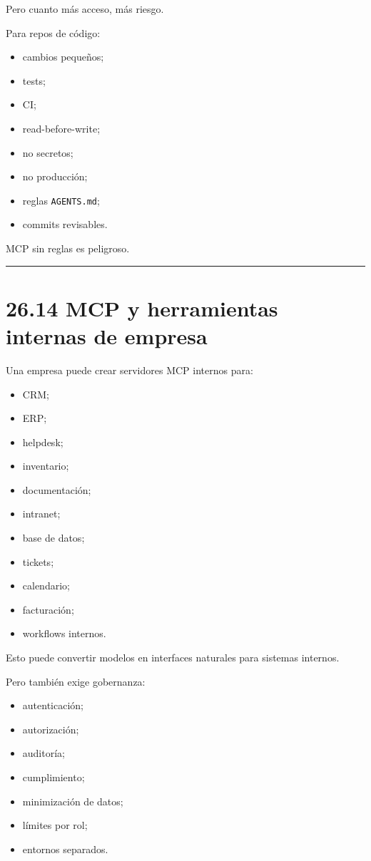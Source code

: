 Pero cuanto más acceso, más riesgo.

Para repos de código:

\begin{itemize}
\tightlist
\item
  cambios pequeños;
\item
  tests;
\item
  CI;
\item
  read-before-write;
\item
  no secretos;
\item
  no producción;
\item
  reglas \passthrough{\lstinline!AGENTS.md!};
\item
  commits revisables.
\end{itemize}

MCP sin reglas es peligroso.

\begin{center}\rule{0.5\linewidth}{0.5pt}\end{center}

\section{26.14 MCP y herramientas internas de
empresa}\label{mcp-y-herramientas-internas-de-empresa}

Una empresa puede crear servidores MCP internos para:

\begin{itemize}
\tightlist
\item
  CRM;
\item
  ERP;
\item
  helpdesk;
\item
  inventario;
\item
  documentación;
\item
  intranet;
\item
  base de datos;
\item
  tickets;
\item
  calendario;
\item
  facturación;
\item
  workflows internos.
\end{itemize}

Esto puede convertir modelos en interfaces naturales para sistemas
internos.

Pero también exige gobernanza:

\begin{itemize}
\tightlist
\item
  autenticación;
\item
  autorización;
\item
  auditoría;
\item
  cumplimiento;
\item
  minimización de datos;
\item
  límites por rol;
\item
  entornos separados.
\end{itemize}

